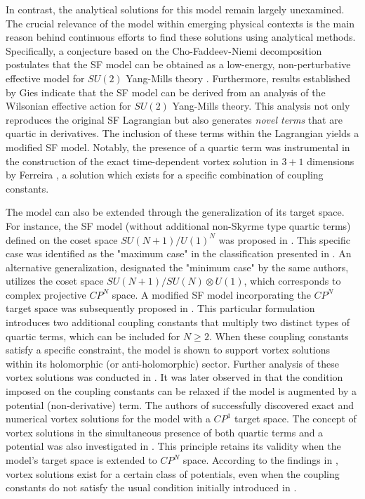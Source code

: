 \documentclass[aps,prd,superscriptaddress,notitlepage,11pt,final,longbibliography,nofootinbib]{revtex4-1}
\numberwithin{equation}{section}
\begin{document}
In contrast, the analytical solutions for this model remain largely unexamined. The crucial relevance of the model within emerging physical contexts is the main reason behind continuous efforts to find these solutions using analytical methods. Specifically, a conjecture based on the Cho-Faddeev-Niemi decomposition postulates that the SF model can be obtained as a low-energy, non-perturbative effective model for $SU(2)$ Yang-Mills theory \cite{Faddeev:1998yz}. Furthermore, results established by Gies \cite{Gies:2001hk} indicate that the SF model can be derived from an analysis of the Wilsonian effective action for $SU(2)$ Yang-Mills theory. This analysis not only reproduces the original SF Lagrangian but also generates {\it novel terms} that are quartic in derivatives. The inclusion of these terms within the Lagrangian yields a modified SF model. Notably, the presence of a quartic term was instrumental in the construction of the exact time-dependent vortex solution in $3+1$ dimensions by Ferreira \cite{Ferreira:2008nn}, a solution which exists for a specific combination of coupling constants.



The model can also be extended through the generalization of its target space. For instance, the SF model (without additional non-Skyrme type quartic terms) defined on the coset space $SU(N+1)/U(1)^N$ was proposed in \cite{Faddeev:1999cj}. This specific case was identified as the "maximum case" in the classification presented in \cite{Kondo:2008xa}. An alternative generalization, designated the "minimum case" by the same authors, utilizes the coset space $SU(N+1)/SU(N)\otimes U(1)$, which corresponds to complex projective $CP^N$ space. A modified SF model incorporating the $CP^N$ target space was subsequently proposed in \cite{Ferreira:2010jb}. This particular formulation introduces two additional coupling constants that multiply two distinct types of quartic terms, which can be included for $N\ge 2$. When these coupling constants satisfy a specific constraint, the model is shown to support vortex solutions within its holomorphic (or anti-holomorphic) sector. Further analysis of these vortex solutions was conducted in \cite{Ferreira:2011ja}. It was later observed in \cite{Ferreira:2011mz} that the condition imposed on the coupling constants can be relaxed if the model is augmented by a potential (non-derivative) term. The authors of \cite{Ferreira:2011mz} successfully discovered exact and numerical vortex solutions for the model with a $CP^1$ target space. The concept of vortex solutions in the simultaneous presence of both quartic terms and a potential was also investigated in \cite{Sawado:2013yza}. This principle retains its validity when the model's target space is extended to $CP^N$ space. According to the findings in \cite{Amari:2015sva}, vortex solutions exist for a certain class of potentials, even when the coupling constants do not satisfy the usual condition initially introduced in \cite{Ferreira:2010jb}.
\end{document}
